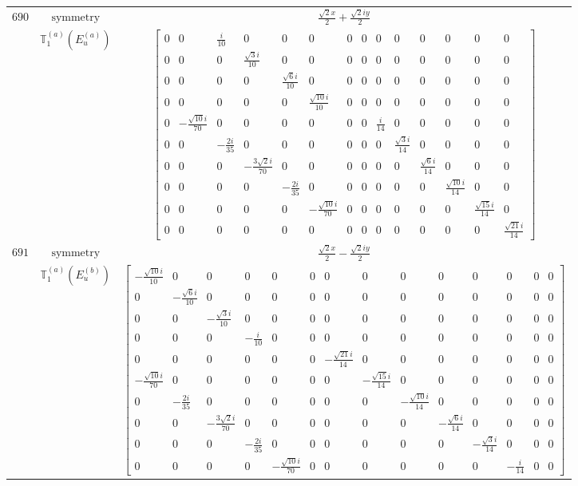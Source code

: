 \documentclass[fleqn,8pt,landscape]{jsarticle}
\begin{document}
\begin{longtable}{ccc}
$ 690 $ & $ \text{symmetry} $ & $ \frac{\sqrt{2} x}{2} + \frac{\sqrt{2} i y}{2} $ \\
$  $ & $ \mathbb{T}_{1}^{(a)}(E_{u}^{(a)}) $ & $ \begin{bmatrix} 0 & 0 & \frac{i}{10} & 0 & 0 & 0 & 0 & 0 & 0 & 0 & 0 & 0 & 0 & 0 \\ 0 & 0 & 0 & \frac{\sqrt{3} i}{10} & 0 & 0 & 0 & 0 & 0 & 0 & 0 & 0 & 0 & 0 \\ 0 & 0 & 0 & 0 & \frac{\sqrt{6} i}{10} & 0 & 0 & 0 & 0 & 0 & 0 & 0 & 0 & 0 \\ 0 & 0 & 0 & 0 & 0 & \frac{\sqrt{10} i}{10} & 0 & 0 & 0 & 0 & 0 & 0 & 0 & 0 \\ 0 & - \frac{\sqrt{10} i}{70} & 0 & 0 & 0 & 0 & 0 & 0 & \frac{i}{14} & 0 & 0 & 0 & 0 & 0 \\ 0 & 0 & - \frac{2 i}{35} & 0 & 0 & 0 & 0 & 0 & 0 & \frac{\sqrt{3} i}{14} & 0 & 0 & 0 & 0 \\ 0 & 0 & 0 & - \frac{3 \sqrt{2} i}{70} & 0 & 0 & 0 & 0 & 0 & 0 & \frac{\sqrt{6} i}{14} & 0 & 0 & 0 \\ 0 & 0 & 0 & 0 & - \frac{2 i}{35} & 0 & 0 & 0 & 0 & 0 & 0 & \frac{\sqrt{10} i}{14} & 0 & 0 \\ 0 & 0 & 0 & 0 & 0 & - \frac{\sqrt{10} i}{70} & 0 & 0 & 0 & 0 & 0 & 0 & \frac{\sqrt{15} i}{14} & 0 \\ 0 & 0 & 0 & 0 & 0 & 0 & 0 & 0 & 0 & 0 & 0 & 0 & 0 & \frac{\sqrt{21} i}{14} \end{bmatrix} $ \\ \hline
$ 691 $ & $ \text{symmetry} $ & $ \frac{\sqrt{2} x}{2} - \frac{\sqrt{2} i y}{2} $ \\
$  $ & $ \mathbb{T}_{1}^{(a)}(E_{u}^{(b)}) $ & $ \begin{bmatrix} - \frac{\sqrt{10} i}{10} & 0 & 0 & 0 & 0 & 0 & 0 & 0 & 0 & 0 & 0 & 0 & 0 & 0 \\ 0 & - \frac{\sqrt{6} i}{10} & 0 & 0 & 0 & 0 & 0 & 0 & 0 & 0 & 0 & 0 & 0 & 0 \\ 0 & 0 & - \frac{\sqrt{3} i}{10} & 0 & 0 & 0 & 0 & 0 & 0 & 0 & 0 & 0 & 0 & 0 \\ 0 & 0 & 0 & - \frac{i}{10} & 0 & 0 & 0 & 0 & 0 & 0 & 0 & 0 & 0 & 0 \\ 0 & 0 & 0 & 0 & 0 & 0 & - \frac{\sqrt{21} i}{14} & 0 & 0 & 0 & 0 & 0 & 0 & 0 \\ - \frac{\sqrt{10} i}{70} & 0 & 0 & 0 & 0 & 0 & 0 & - \frac{\sqrt{15} i}{14} & 0 & 0 & 0 & 0 & 0 & 0 \\ 0 & - \frac{2 i}{35} & 0 & 0 & 0 & 0 & 0 & 0 & - \frac{\sqrt{10} i}{14} & 0 & 0 & 0 & 0 & 0 \\ 0 & 0 & - \frac{3 \sqrt{2} i}{70} & 0 & 0 & 0 & 0 & 0 & 0 & - \frac{\sqrt{6} i}{14} & 0 & 0 & 0 & 0 \\ 0 & 0 & 0 & - \frac{2 i}{35} & 0 & 0 & 0 & 0 & 0 & 0 & - \frac{\sqrt{3} i}{14} & 0 & 0 & 0 \\ 0 & 0 & 0 & 0 & - \frac{\sqrt{10} i}{70} & 0 & 0 & 0 & 0 & 0 & 0 & - \frac{i}{14} & 0 & 0 \end{bmatrix} $ \\ \hline

\end{longtable}
\end{document}
